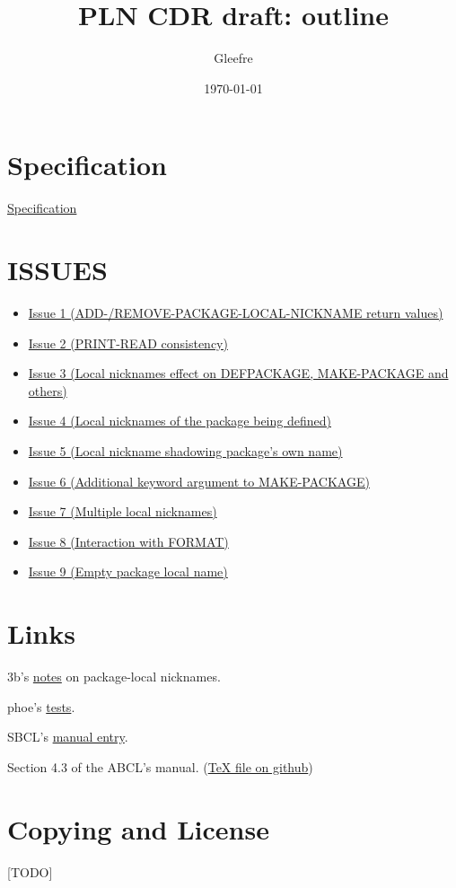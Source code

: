 \documentclass[11pt]{article}
\author{Gleefre}
\date{\today}
\title{PLN CDR draft: outline}
\begin{document}

\section{Specification}
\label{sec:orgad39f70}
\href{./spec.org}{Specification}
\section{ISSUES}
\label{sec:orgfbd0345}
\begin{itemize}
\item \href{./issues/1.org}{Issue 1 (ADD-/REMOVE-PACKAGE-LOCAL-NICKNAME return values)}
\item \href{./issues/2.org}{Issue 2 (PRINT-READ consistency)}
\item \href{./issues/3.org}{Issue 3 (Local nicknames effect on DEFPACKAGE, MAKE-PACKAGE and others)}
\item \href{./issues/4.org}{Issue 4 (Local nicknames of the package being defined)}
\item \href{./issues/5.org}{Issue 5 (Local nickname shadowing package's own name)}
\item \href{./issues/6.org}{Issue 6 (Additional keyword argument to MAKE-PACKAGE)}
\item \href{./issues/7.org}{Issue 7 (Multiple local nicknames)}
\item \href{./issues/8.org}{Issue 8 (Interaction with FORMAT)}
\item \href{./issues/9.org}{Issue 9 (Empty package local name)}
\end{itemize}
\section{Links}
\label{sec:orga527796}
3b's \href{https://github.com/3b/package-local-nicknames/blob/master/docs.org}{notes} on package-local nicknames.

phoe's \href{https://github.com/phoe/trivial-package-local-nicknames}{tests}.

SBCL's \href{https://www.sbcl.org/manual/\#Package\_002dLocal-Nicknames}{manual entry}.

Section 4.3 of the ABCL's manual. (\href{https://github.com/armedbear/abcl/blob/master/doc/manual/abcl.tex\#L1249}{\TeX{} file on github})
\section{Copying and License}
\label{sec:org28f47b9}
[TODO]
\end{document}
